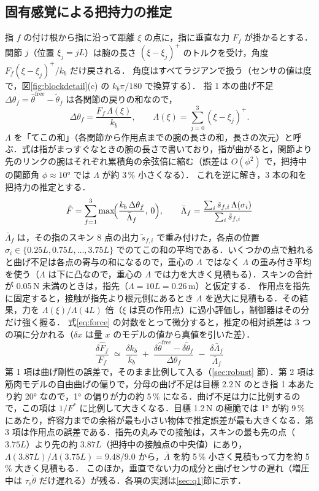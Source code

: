 \documentclass[a4paper,twocolumn,10pt]{ltjsarticle}
\begin{document}
\subsection{固有感覚による把持力の推定}
\label{sec:est}
指 $f$ の付け根から指に沿って距離 $\xi$ の点に，指に垂直な力 $F_f$ が掛かるとする．関節 $j$（位置 $\xi_j=jL$）は腕の長さ $(\xi-\xi_j)^+$ のトルクを受け，角度 $F_f(\xi-\xi_j)^+/k_b$ だけ戻される．
角度はすべてラジアンで扱う（センサの値は度で，図\ref{fig:blockdetail}(c) の $k_b\pi/180$ で換算する）．
指 1 本の曲げ不足 $\Delta\theta_f=\hat\theta^{\mathrm{free}}-\tilde\theta_f$ は各関節の戻りの和なので，
\begin{equation}
\Delta\theta_f=\frac{F_f\,\Lambda(\xi)}{k_b},\qquad \Lambda(\xi)=\sum_{j=0}^{3}(\xi-\xi_j)^+ .
\end{equation}
$\Lambda$ を「てこの和」（各関節から作用点までの腕の長さの和，長さの次元）と呼ぶ．式は指がまっすぐなときの腕の長さで書いており，指が曲がると，関節より先のリンクの腕はそれぞれ累積角の余弦倍に縮む（誤差は $O(\phi^2)$ で，把持中の関節角 $\phi\approx10°$ では $\Lambda$ が約 3\,\% 小さくなる）．
これを逆に解き，3 本の和を把持力の推定とする．
\begin{equation}
\hat F=\sum_{f=1}^{3}\max\!\Bigl(\frac{k_b\,\Delta\theta_f}{\bar\Lambda_f},\,0\Bigr),\qquad
\bar\Lambda_f=\frac{\sum_i \tilde s_{f,i}\,\Lambda(\sigma_i)}{\sum_i \tilde s_{f,i}}
\label{eq:force}
\end{equation}
$\bar\Lambda_f$ は，その指のスキン 8 点の出力 $\tilde s_{f,i}$ で重み付けた，各点の位置 $\sigma_i\in\{0.25L,0.75L,\dots,3.75L\}$ でのてこの和の平均である．いくつかの点で触れると曲げ不足は各点の寄与の和になるので，重心の $\Lambda$ ではなく $\Lambda$ の重み付き平均を使う（$\Lambda$ は下に凸なので，重心の $\Lambda$ では力を大きく見積もる）．スキンの合計が 0.05\,N 未満のときは，指先（$\Lambda=10L=0.26$\,m）と仮定する．
作用点を指先に固定すると，接触が指先より根元側にあるとき $\Lambda$ を過大に見積もる．その結果，力を $\Lambda(\xi)/\Lambda(4L)$ 倍（$\xi$ は真の作用点）に過小評価し，制御器はその分だけ強く握る．
式\eqref{eq:force} の対数をとって微分すると，推定の相対誤差は 3 つの項に分かれる（$\delta x$ は量 $x$ のモデルの値から真値を引いた差）．
\begin{equation}
\frac{\delta\hat F_f}{F_f}\;\simeq\;\frac{\delta k_b}{k_b}\;+\;\frac{\delta\hat\theta^{\mathrm{free}}-\delta\tilde\theta_f}{\Delta\theta_f}\;-\;\frac{\delta\bar\Lambda_f}{\bar\Lambda_f}
\label{eq:errsplit}
\end{equation}
第 1 項は曲げ剛性の誤差で，そのまま比例して入る（\ref{sec:robust} 節）．第 2 項は筋肉モデルの自由曲げの偏りで，分母の曲げ不足は目標 2.2\,N のとき指 1 本あたり約 20° なので，1° の偏りが力の約 5\,\% になる．曲げ不足は力に比例するので，この項は $1/F^*$ に比例して大きくなる．目標 1.2\,N の極脆では 1° が約 9\,\% にあたり，許容力までの余裕が最も小さい物体で推定誤差が最も大きくなる．第 3 項は作用点の誤差である．指先の丸みでの接触は，スキンの最も先の点（$3.75L$）より先の約 $3.87L$（把持中の接触点の中央値）にあり，$\Lambda(3.87L)/\Lambda(3.75L)=9.48/9.0$ から，$\bar\Lambda$ を約 5\,\% 小さく見積もって力を約 5\,\% 大きく見積もる．
このほか，垂直でない力の成分と曲げセンサの遅れ（増圧中は $\tau_s\dot\theta$ だけ遅れる）が残る．各項の実測は\ref{sec:q1}節に示す．
\end{document}
